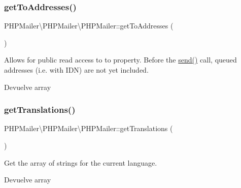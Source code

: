 \subsubsection{\texorpdfstring{get\+To\+Addresses()}{getToAddresses()}}
{\footnotesize\ttfamily P\+H\+P\+Mailer\textbackslash{}\+P\+H\+P\+Mailer\textbackslash{}\+P\+H\+P\+Mailer\+::get\+To\+Addresses (\begin{DoxyParamCaption}{ }\end{DoxyParamCaption})}

Allows for public read access to \textquotesingle{}to\textquotesingle{} property. Before the \hyperlink{classPHPMailer_1_1PHPMailer_1_1PHPMailer_a80ad2451096e940360c7439c22303edf}{send()} call, queued addresses (i.\+e. with I\+DN) are not yet included.

\begin{DoxyReturn}{Devuelve}
array 
\end{DoxyReturn}
\mbox{\label{classPHPMailer_1_1PHPMailer_1_1PHPMailer_a48e6719b93132b0098cdddcfbca0aa85}} 
\subsubsection{\texorpdfstring{get\+Translations()}{getTranslations()}}
{\footnotesize\ttfamily P\+H\+P\+Mailer\textbackslash{}\+P\+H\+P\+Mailer\textbackslash{}\+P\+H\+P\+Mailer\+::get\+Translations (\begin{DoxyParamCaption}{ }\end{DoxyParamCaption})}

Get the array of strings for the current language.

\begin{DoxyReturn}{Devuelve}
array 
\end{DoxyReturn}
\mbox{\label{classPHPMailer_1_1PHPMailer_1_1PHPMailer_afe16e85960abfd23ea1ac9ea75ae6720}} 
